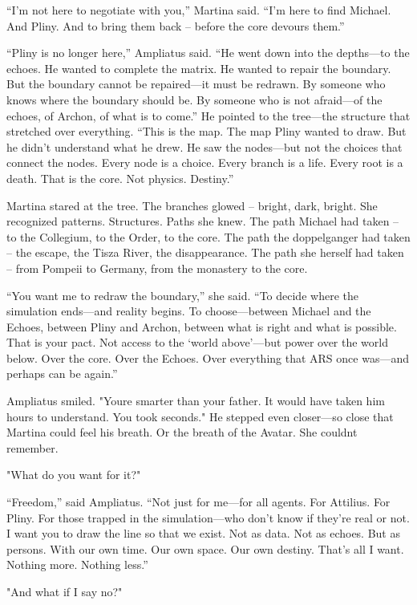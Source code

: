 \documentclass[
]{article}
\begin{document}
``I'm not here to negotiate with you,'' Martina said. ``I'm here to find Michael. And Pliny. And to bring them back -- before the core devours them.''

``Pliny is no longer here,'' Ampliatus said. ``He went down into the depths---to the echoes. He wanted to complete the matrix. He wanted to repair the boundary. But the boundary cannot be repaired---it must be redrawn. By someone who knows where the boundary should be. By someone who is not afraid---of the echoes, of Archon, of what is to come.'' He pointed to the tree---the structure that stretched over everything. ``This is the map. The map Pliny wanted to draw. But he didn't understand what he drew. He saw the nodes---but not the choices that connect the nodes. Every node is a choice. Every branch is a life. Every root is a death. That is the core. Not physics. Destiny.''

Martina stared at the tree. The branches glowed -- bright, dark, bright. She recognized patterns. Structures. Paths she knew. The path Michael had taken -- to the Collegium, to the Order, to the core. The path the doppelganger had taken -- the escape, the Tisza River, the disappearance. The path she herself had taken -- from Pompeii to Germany, from the monastery to the core.

``You want me to redraw the boundary,'' she said. ``To decide where the simulation ends---and reality begins. To choose---between Michael and the Echoes, between Pliny and Archon, between what is right and what is possible. That is your pact. Not access to the `world above'---but power over the world below. Over the core. Over the Echoes. Over everything that ARS once was---and perhaps can be again.''

Ampliatus smiled. "You\textquotesingle re smarter than your father. It would have taken him hours to understand. You took seconds." He stepped even closer---so close that Martina could feel his breath. Or the breath of the Avatar. She couldn\textquotesingle t remember.

"What do you want for it?"

``Freedom,'' said Ampliatus. ``Not just for me---for all agents. For Attilius. For Pliny. For those trapped in the simulation---who don't know if they're real or not. I want you to draw the line so that we exist. Not as data. Not as echoes. But as persons. With our own time. Our own space. Our own destiny. That's all I want. Nothing more. Nothing less.''

"And what if I say no?"
\end{document}

